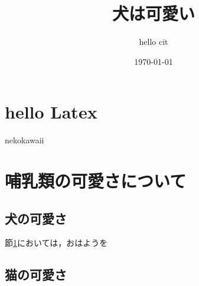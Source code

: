 \documentclass{jsarticle}
\title{犬は可愛い}
\author{hello cit}
\date{\today}
\begin{document}
\maketitle
\tableofcontents%

\section{hello Latex}
\label{hello}

nekokawaii

\section{哺乳類の可愛さについて}
\subsection{犬の可愛さ}
節\ref{hello}においては，おはようを

\subsection{猫の可愛さ}
\end{document}
